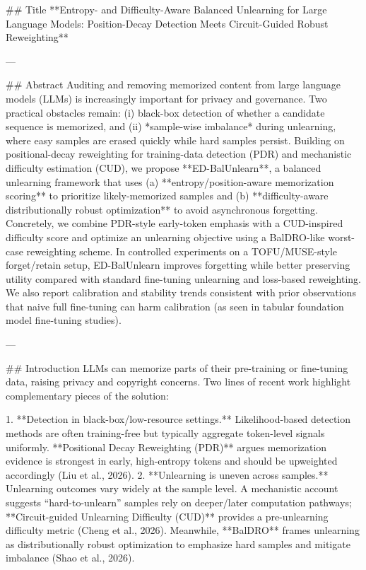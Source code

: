 ## Title  
**Entropy- and Difficulty-Aware Balanced Unlearning for Large Language Models: Position-Decay Detection Meets Circuit-Guided Robust Reweighting**

---

## Abstract  
Auditing and removing memorized content from large language models (LLMs) is increasingly important for privacy and governance. Two practical obstacles remain: (i) black-box detection of whether a candidate sequence is memorized, and (ii) *sample-wise imbalance* during unlearning, where easy samples are erased quickly while hard samples persist. Building on positional-decay reweighting for training-data detection (PDR) and mechanistic difficulty estimation (CUD), we propose **ED-BalUnlearn**, a balanced unlearning framework that uses (a) **entropy/position-aware memorization scoring** to prioritize likely-memorized samples and (b) **difficulty-aware distributionally robust optimization** to avoid asynchronous forgetting. Concretely, we combine PDR-style early-token emphasis with a CUD-inspired difficulty score and optimize an unlearning objective using a BalDRO-like worst-case reweighting scheme. In controlled experiments on a TOFU/MUSE-style forget/retain setup, ED-BalUnlearn improves forgetting while better preserving utility compared with standard fine-tuning unlearning and loss-based reweighting. We also report calibration and stability trends consistent with prior observations that naive full fine-tuning can harm calibration (as seen in tabular foundation model fine-tuning studies).  

---

## Introduction  
LLMs can memorize parts of their pre-training or fine-tuning data, raising privacy and copyright concerns. Two lines of recent work highlight complementary pieces of the solution:

1. **Detection in black-box/low-resource settings.** Likelihood-based detection methods are often training-free but typically aggregate token-level signals uniformly. **Positional Decay Reweighting (PDR)** argues memorization evidence is strongest in early, high-entropy tokens and should be upweighted accordingly (Liu et al., 2026).  
2. **Unlearning is uneven across samples.** Unlearning outcomes vary widely at the sample level. A mechanistic account suggests “hard-to-unlearn” samples rely on deeper/later computation pathways; **Circuit-guided Unlearning Difficulty (CUD)** provides a pre-unlearning difficulty metric (Cheng et al., 2026). Meanwhile, **BalDRO** frames unlearning as distributionally robust optimization to emphasize hard samples and mitigate imbalance (Shao et al., 2026).

